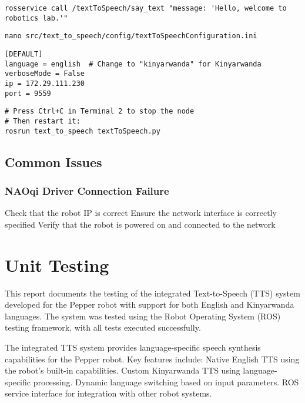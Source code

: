 \documentclass{CSSRforAfrica}
\begin{document}
\begin{lstlisting}[style=commandstyle]
rosservice call /textToSpeech/say_text "message: 'Hello, welcome to robotics lab.'"
\end{lstlisting}

\begin{lstlisting}[style=commandstyle]
nano src/text_to_speech/config/textToSpeechConfiguration.ini
\end{lstlisting}

\begin{lstlisting}[style=commandstyle]
[DEFAULT]
language = english  # Change to "kinyarwanda" for Kinyarwanda
verboseMode = False
ip = 172.29.111.230
port = 9559
\end{lstlisting}

\begin{lstlisting}[style=commandstyle]
# Press Ctrl+C in Terminal 2 to stop the node
# Then restart it:
rosrun text_to_speech textToSpeech.py
\end{lstlisting}

\subsection{Common Issues}

\subsubsection{NAOqi Driver Connection Failure}

Check that the robot IP is correct
Ensure the network interface is correctly specified
Verify that the robot is powered on and connected to the network


\newpage



\section{Unit Testing}

This report documents the testing of the integrated Text-to-Speech (TTS) system developed for the Pepper robot with support for both English and Kinyarwanda languages. The system was tested using the Robot Operating System (ROS) testing framework, with all tests executed successfully. 

The integrated TTS system provides language-specific speech synthesis capabilities for the Pepper robot. Key features include:
 Native English TTS using the robot's built-in capabilities.
 Custom Kinyarwanda TTS using language-specific processing.
 Dynamic language switching based on input parameters.
 ROS service interface for integration with other robot systems.
\end{document}
